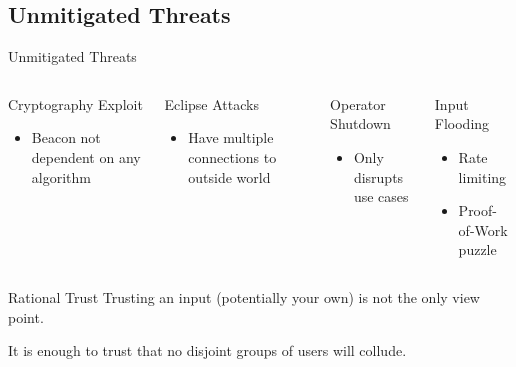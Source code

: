 \subsection{Unmitigated Threats}

\begin{frame}{Unmitigated Threats}
    \begin{columns}[T,onlytextwidth]

        \begin{block}{Cryptography Exploit}
            \begin{itemize}

                \item Beacon not dependent on any algorithm
            \end{itemize}
        \end{block}
        \pause
        \begin{block}{Eclipse Attacks}
            \begin{itemize}
                \item Have multiple connections to outside world
            \end{itemize}
        \end{block}

        \pause
        \begin{block}{Operator Shutdown}
            \begin{itemize}
                \item Only disrupts use cases
            \end{itemize}
        \end{block}

        \pause
        \begin{block}{Input Flooding}
          \begin{itemize}
              \item Rate limiting
              \item Proof-of-Work puzzle
          \end{itemize}
        \end{block}

    \end{columns}
\end{frame}

\begin{frame}{Rational Trust}
    Trusting an input (potentially your own) is not the only view point.
    \pause

    It is enough to trust that no disjoint groups of users will collude.
\end{frame}

